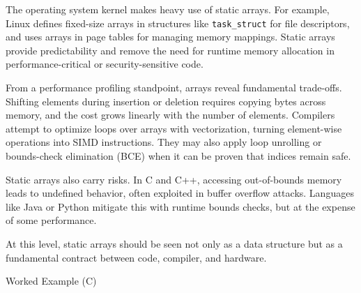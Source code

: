 \documentclass[
  letterpaper,
  DIV=11,
  numbers=noendperiod]{scrreprt}
\begin{document}
The operating system kernel makes heavy use of static arrays. For
example, Linux defines fixed-size arrays in structures like
\texttt{task\_struct} for file descriptors, and uses arrays in page
tables for managing memory mappings. Static arrays provide
predictability and remove the need for runtime memory allocation in
performance-critical or security-sensitive code.

From a performance profiling standpoint, arrays reveal fundamental
trade-offs. Shifting elements during insertion or deletion requires
copying bytes across memory, and the cost grows linearly with the number
of elements. Compilers attempt to optimize loops over arrays with
vectorization, turning element-wise operations into SIMD instructions.
They may also apply loop unrolling or bounds-check elimination (BCE)
when it can be proven that indices remain safe.

Static arrays also carry risks. In C and C++, accessing out-of-bounds
memory leads to undefined behavior, often exploited in buffer overflow
attacks. Languages like Java or Python mitigate this with runtime bounds
checks, but at the expense of some performance.

At this level, static arrays should be seen not only as a data structure
but as a fundamental contract between code, compiler, and hardware.

Worked Example (C)
\end{document}

